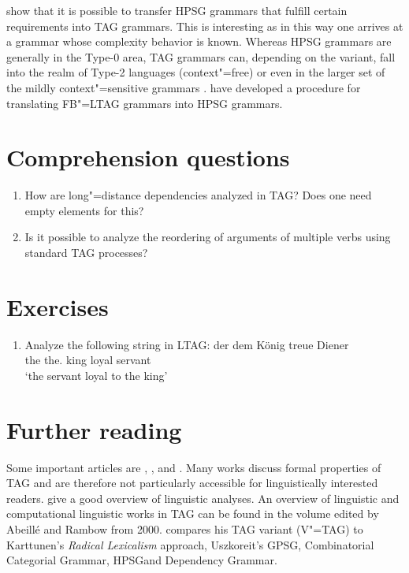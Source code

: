 \citet*{KKNV95a} show that it is possible to transfer HPSG grammars that fulfill certain requirements into TAG grammars. This is interesting
as in this way one arrives at a grammar whose complexity behavior is known. Whereas HPSG grammars are generally
in the Type-0 area, TAG grammars can, depending on the variant, fall into the realm of Type-2 languages (context"=free) or even in the
larger set of the mildly context"=sensitive grammars \citep{Joshi85a-u}. \citet*{YMTT2001a} have developed a procedure for translating FB"=LTAG grammars into
HPSG grammars.


\section*{Comprehension questions}

\begin{enumerate}
\item How are long"=distance dependencies analyzed in TAG? Does one need empty elements for this?
\item Is it possible to analyze the reordering of arguments of multiple verbs using standard TAG processes?
\end{enumerate} 

\section*{Exercises}

\begin{enumerate}
\item Analyze the following string in LTAG:
\ea
\gll der dem König treue Diener\\
	 the the.\dat{} king loyal servant\\
\glt `the servant loyal to the king'
\z
\end{enumerate}

\section*{Further reading}

Some important articles are , , and . Many works discuss formal properties of TAG and are therefore not particularly accessible for
linguistically interested readers.  give a good overview of linguistic analyses. An overview of linguistic and computational linguistic
works in TAG can be found in the volume edited by Abeill{\'e} and
Rambow\nocite{AR2000a-ed-not-crossreferenced} from 2000. \citet{Rambow94a} compares his TAG variant (V"=TAG) to Karttunen's \emph{Radical Lexicalism} approach, Uszkoreit's GPSG\indexgpsg,
Combinatorial Categorial Grammar\indexcg, HPSG\indexhpsg and
Dependency Grammar\indexdg. 

